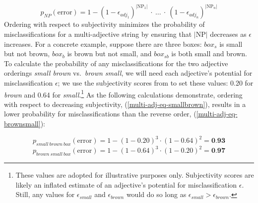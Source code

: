 \documentclass[preprint,authoryear]{elsarticle}\frenchspacing
\newcommand{\gcs}[1]{\textcolor{blue}{[gcs: #1]}}
\begin{document}
\begin{equation} \label{multi-adj-eq}
p_{N\!P}(\textrm{error}) = 1 - (1-\epsilon_{adj_1})^{|\textrm{NP}_1|}\ \cdot\ \ldots\ \cdot\ (1-\epsilon_{adj_n})^{|\textrm{NP}_n|}
\end{equation}
Ordering with respect to subjectivity minimizes the probability of misclassifications for a multi-adjective string by ensuring that $|\textrm{NP}|$ decreases as $\epsilon$ increases. For a concrete example, suppose there are three boxes: $box_{s}$ is small but not brown, $box_{b}$ is brown but not small, and $box_{sb}$ is both small and brown. To calculate the probability of any misclassifications for the two adjective orderings \emph{small brown} vs.~\emph{brown small}, we will need each adjective's potential for misclassification $\epsilon$; we use the subjectivity scores from \cite{scontrasetal2017adjectives} to set these values: 0.20 for \emph{brown} and 0.64 for \emph{small}.\footnote{These values are adopted for illustrative purposes only. Subjectivity scores are likely an inflated estimate of an adjective's potential for misclassification $\epsilon$. Still, any values for $\epsilon_{small}$ and $\epsilon_{brown}$ would do so long as $\epsilon_{small} > \epsilon_{brown}$.} As the following calculations demonstrate, ordering with respect to decreasing subjectivity, (\ref{multi-adj-eq-smallbrown}), results in a lower probability for misclassifications than the reverse order, (\ref{multi-adj-eq-brownsmall}):

\begin{equation} \label{multi-adj-eq-smallbrown}
p_{small\ brown\ box}(\textrm{error}) = 1 - (1-0.20)^{3} \cdot (1-0.64)^{2} = \textbf{0.93}
\end{equation}
\begin{equation} \label{multi-adj-eq-brownsmall}
p_{brown\ small\ box}(\textrm{error}) = 1 - (1-0.64)^{3} \cdot (1-0.20)^{2} = \textbf{0.97}
\end{equation}
\end{document}

